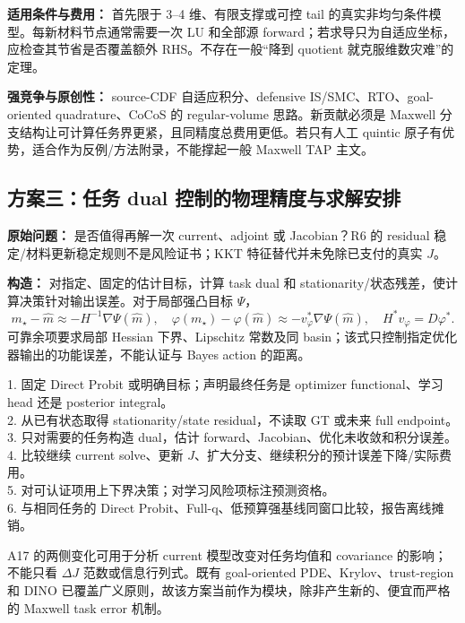 \textbf{适用条件与费用：} 首先限于 3--4 维、有限支撑或可控 tail 的真实非均匀条件模型。每新材料节点通常需要一次 LU 和全部源 forward；若求导只为自适应坐标，应检查其节省是否覆盖额外 RHS。不存在一般“降到 quotient 就克服维数灾难”的定理。

\textbf{强竞争与原创性：} source-CDF 自适应积分、defensive IS/SMC、RTO、goal-oriented quadrature、CoCoS 的 regular-volume 思路。新贡献必须是 Maxwell 分支结构让可计算任务界更紧，且同精度总费用更低。若只有人工 quintic 原子有优势，适合作为反例/方法附录，不能撑起一般 Maxwell TAP 主文。

\subsection{方案三：任务 dual 控制的物理精度与求解安排}
\textbf{原始问题：} 是否值得再解一次 current、adjoint 或 Jacobian？R6 的 residual 稳定/材料更新稳定规则不是风险证书；KKT 特征替代并未免除已支付的真实 $J$。

\textbf{构造：} 对指定、固定的估计目标，计算 task dual 和 stationarity/状态残差，使计算决策针对输出误差。对于局部强凸目标 $\Psi$，
\[
m_\star-\widehat m\approx-H^{-1}\nabla\Psi(\widehat m),\quad
\varphi(m_\star)-\varphi(\widehat m)
\approx-v_\varphi^*\nabla\Psi(\widehat m),
\quad H^*v_\varphi=D\varphi^*.
\]
可靠余项要求局部 Hessian 下界、Lipschitz 常数及同 basin；该式只控制指定优化器输出的功能误差，不能认证与 Bayes action 的距离。

\begin{tcolorbox}[title={算法 3：task-dual physical work control}]
1. 固定 Direct Probit 或明确目标；声明最终任务是 optimizer functional、学习 head 还是 posterior integral。\\
2. 从已有状态取得 stationarity/state residual，不读取 GT 或未来 full endpoint。\\
3. 只对需要的任务构造 dual，估计 forward、Jacobian、优化未收敛和积分误差。\\
4. 比较继续 current solve、更新 $J$、扩大分支、继续积分的预计误差下降/实际费用。\\
5. 对可认证项用上下界决策；对学习风险项标注预测资格。\\
6. 与相同任务的 Direct Probit、Full-q、低预算强基线同窗口比较，报告离线摊销。
\end{tcolorbox}

A17 的两侧变化可用于分析 current 模型改变对任务均值和 covariance 的影响；不能只看 $\Delta J$ 范数或信息行列式。既有 goal-oriented PDE、Krylov、trust-region 和 DINO 已覆盖广义原则，故该方案当前作为模块，除非产生新的、便宜而严格的 Maxwell task error 机制。

